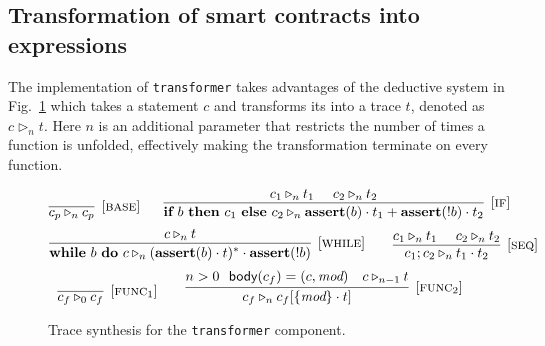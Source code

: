\subsection{Transformation of smart contracts into expressions}

The implementation of \texttt{transformer} takes advantages of the deductive system in Fig.~\ref{fig:syn} which takes a statement $c$ and transforms its into a trace $t$, denoted as $c \triangleright_{n} t$. Here $n$ is an additional parameter that restricts the number of times a function is unfolded, effectively making the transformation terminate on every function.

\begin{figure}
$$
\infer[{[\rname{base}]}]{c_p \trans_{n} c_p}{}
~~~~~
\infer[{[\rname{if}]}]{\ifs{b}{c_1}{c_2} \trans_{n} \textbf{assert}(b) \nxt t_1+\textbf{assert}(!b) \nxt t_2}{c_1 \trans_{n} t_1~~~~ c_2 \trans_{n} t_2}
$$
$$
\infer[{[\rname{while}]}]{\whiles{b}{c} \trans_{n} (\textbf{assert}(b) \nxt t)^* \nxt \textbf{assert}(!b)}{c \trans_{n} t}
~~~~~~
\infer[{[\rname{seq}]}]{c_1;c_2 \trans_{n} t_1 \nxt t_2}{c_1 \trans_{n} t_1~~~~ c_2 \trans_{n} t_2}
$$
$$
\infer[{[\rname{func}_1]}]{c_f \trans_{0} c_f}{}
~~~~~~
\infer[{[\rname{func}_2]}]{c_f \trans_{n} c_f[\{\textit{mod}\} \nxt t]}{n > 0~~\textsf{body}(c_f) = (c,\textit{mod})~~~c \trans_{n-1} t}
$$
\caption{Trace synthesis for the \texttt{transformer} component.}\label{fig:syn}
\end{figure}


